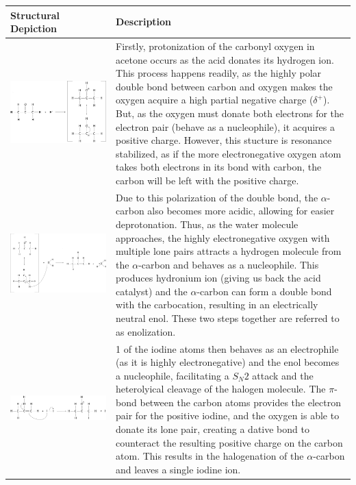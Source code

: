\begin{table}[h!]
\centering
\begin{tabular}{m{6cm} m{10cm}} 
 \toprule
 Structural Depiction & Description \TBstrut\\
 \midrule
 \includegraphics[width=.35\textwidth]{fig/images/mechanism/protonization.pdf} & Firstly, protonization of the carbonyl oxygen in acetone occurs as the acid donates its hydrogen ion. This process happens readily, as the highly polar double bond between carbon and oxygen makes the oxygen acquire a high partial negative charge ($\delta^+$). But, as the oxygen must donate both electrons for the electron pair (behave as a nucleophile), it acquires a positive charge. However, this stucture is resonance stabilized, as if the more electronegative oxygen atom takes both electrons in its bond with carbon, the carbon will be left with the positive charge. \\
 \midrule
 \includegraphics[width=.35\textwidth]{fig/images/mechanism/hydration.pdf} & Due to this polarization of the double bond, the $\alpha$-carbon also becomes more acidic, allowing for easier deprotonation. Thus, as the water molecule approaches, the highly electronegative oxygen with multiple lone pairs attracts a hydrogen molecule from the $\alpha$-carbon and behaves as a nucleophile. This produces hydronium ion (giving us back the acid catalyst) and the $\alpha$-carbon can form a double bond with the carbocation, resulting in an electrically neutral enol. These two steps together are referred to as enolization. \\
	\midrule
 \includegraphics[width=.35\textwidth]{fig/images/mechanism/sn2.pdf} & 1 of the iodine atoms then behaves as an electrophile (as it is highly electronegative) and the enol becomes a nucleophile, facilitating a $S_N2$ attack and the heterolyical cleavage of the halogen molecule. The $\pi$-bond between the carbon atoms provides the electron pair for the positive iodine, and the oxygen is able to donate its lone pair, creating a dative bond to counteract the resulting positive charge on the carbon atom. This results in the halogenation of the $\alpha$-carbon and leaves a single iodine ion. \\

\end{tabular}
\end{table}
